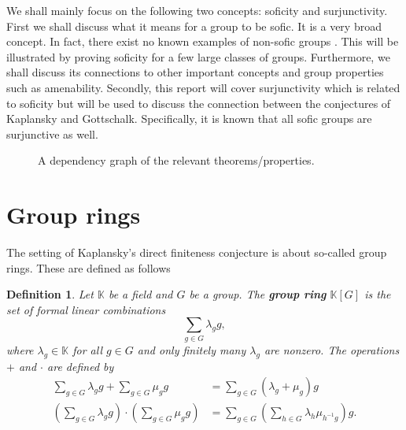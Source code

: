 \documentclass[titlepage, a4paper]{article}
\newcommand{\F}{\mathbb{F}}
\newtheorem{definition}[theorem]{Definition}
\theoremstyle{remark}
\begin{document}
We shall mainly focus on the following two concepts: soficity and surjunctivity. First we shall discuss what it means for a group to be sofic. It is a very broad concept. In fact, there exist no known examples of non-sofic groups \cite{weiss_2000}. This will be illustrated by proving soficity for a few large classes of groups. Furthermore, we shall discuss its connections to other important concepts and group properties such as amenability. Secondly, this report will cover surjunctivity which is related to soficity but will be used to discuss the connection between the conjectures of Kaplansky and Gottschalk. Specifically, it is known that all sofic groups are surjunctive as well.

\begin{figure}[h]
	\centering
{}
\caption{A dependency graph of the relevant theorems/properties. }
\end{figure}
\section{Group rings}\label{sec:group_rings}


The setting of Kaplansky's direct finiteness conjecture is about so-called group rings. These are defined as follows


\begin{definition}\label{def:group_ring}
	Let $\mathbb K$ be a field and $G$ be a group. The \textbf{group ring} $\mathbb K[G]$ is the set of formal linear combinations
    \[
        \sum_{g \in G} \lambda_g g,
    \]
    where $\lambda_g \in \mathbb K$ for all $g \in G$ and only finitely many $\lambda_g$ are nonzero. The operations $+$ and $\cdot$ are defined by
    \begin{align*}
        \sum_{g \in G} \lambda_g g + \sum_{g \in G} \mu_g g
        &= \sum_{g \in G} (\lambda_g+\mu_g) g \\
        \left(\sum_{g \in G} \lambda_g g \right) \cdot \left(\sum_{g \in G} \mu_g g \right)
        &= \sum_{g \in G} \left( \sum_{h \in G} \lambda_{h} \mu_{h^{-1}g} \right) g.
    \end{align*}
\end{definition}
\end{document}
